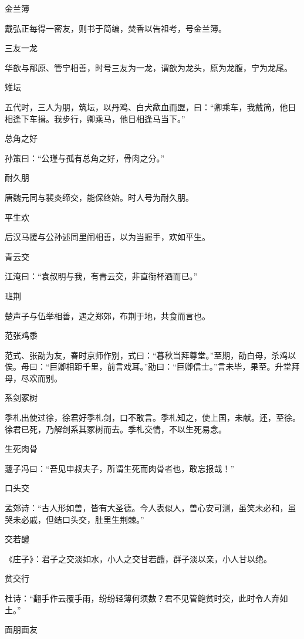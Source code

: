 \documentclass[a4paper,12pt,UTF8,twoside]{ctexbook}
\begin{document}
    金兰簿
    
    戴弘正每得一密友，则书于简编，焚香以告祖考，号金兰簿。
    
    三友一龙
    
    华歆与邴原、管宁相善，时号三友为一龙，谓歆为龙头，原为龙腹，宁为龙尾。
    
    雉坛
    
    五代时，三人为朋，筑坛，以丹鸡、白犬歃血而盟，曰：“卿乘车，我戴简，他日相逢下车揖。我步行，卿乘马，他日相逢马当下。”
    
    总角之好
    
    孙策曰：“公瑾与孤有总角之好，骨肉之分。”
    
    耐久朋
    
    唐魏元同与裴炎缔交，能保终始。时人号为耐久朋。
    
    平生欢
    
    后汉马援与公孙述同里闬相善，以为当握手，欢如平生。
    
    青云交
    
    江淹曰：“袁叔明与我，有青云交，非直衔杯酒而已。”
    
    班荆
    
    楚声子与伍举相善，遇之郑郊，布荆于地，共食而言也。
    
    范张鸡黍
    
    范式、张劭为友，春时京师作别，式曰：“暮秋当拜尊堂。”至期，劭白母，杀鸡以俟。母曰：“巨卿相距千里，前言戏耳。”劭曰：“巨卿信士。”言未毕，果至。升堂拜母，尽欢而别。
    
    系剑冢树
    
    季札出使过徐，徐君好季札剑，口不敢言。季札知之，使上国，未献。还，至徐。徐君已死，乃解剑系其冢树而去。季札交情，不以生死易念。
    
    生死肉骨
    
    蘧子冯曰：“吾见申叔夫子，所谓生死而肉骨者也，敢忘报哉！”
    
    口头交
    
    孟郊诗：“古人形如兽，皆有大圣德。今人表似人，兽心安可测，虽笑未必和，虽哭未必戚，但结口头交，肚里生荆棘。”
    
    交若醴
    
    《庄子》：君子之交淡如水，小人之交甘若醴，群子淡以亲，小人甘以绝。
    
    贫交行
    
    杜诗：“翻手作云覆手雨，纷纷轻薄何须数？君不见管鲍贫时交，此时令人弃如土。”
    
    面朋面友
    
\end{document}
